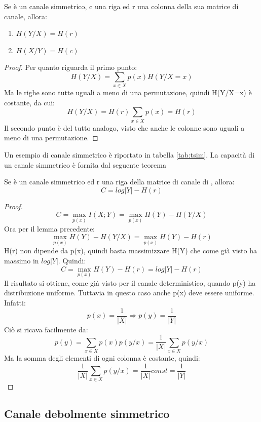 \begin{lemma}
 Se  è un canale simmetrico, c una riga ed r una colonna della sua matrice di canale, allora:
 \begin{enumerate}
  \item $H(Y/X)=H(r)$
  \item $H(X/Y)=H(c)$
 \end{enumerate}
 \begin{proof}
  \mbox{}

  \noindent
  Per quanto riguarda il primo punto:
  \[
   H(Y/X)=\sum_{x \in X}p(x)H(Y/X=x)
  \]
  Ma le righe sono tutte uguali a meno di una permutazione, quindi H(Y/X=x) è costante, da cui:
  \[
   H(Y/X)=H(r)\sum_{x \in X}p(x)=H(r)
  \]
  Il secondo punto è del tutto analogo, visto che anche le colonne sono uguali a meno di una permutazione.
 \end{proof}

\end{lemma}

\noindent
Un esempio di canale simmetrico è riportato in tabella \ref{tab:tsim}.
La capacità di un canale simmetrico è fornita dal seguente teorema

\begin{teorema}
 Se  è un canale simmetrico ed r una riga della matrice di canale di , allora:
 \[
  C=log|Y| - H(r)
 \]
 \begin{proof}
\[
  C=\max_{p(x)} I(X;Y)=\max_{p(x)} H(Y)-H(Y/X)
\]
 Ora per il lemma precedente:
 \[
  \max_{p(x)} H(Y)-H(Y/X)=\max_{p(x)} H(Y)-H(r)
 \]
 H(r) non dipende da p(x), quindi basta massimizzare H(Y) che come già visto ha massimo in $log|Y|$. Quindi:
 \[
  C=\max_{p(x)} H(Y)-H(r)=log |Y| - H(r)
 \]
 Il risultato si ottiene, come già visto per il canale deterministico, quando p(y) ha distribuzione uniforme.
 Tuttavia in questo caso anche p(x) deve essere uniforme. Infatti:
 \[
  p(x)=\frac{1}{|X|} \Rightarrow p(y)=\frac{1}{|Y|}
 \]
 Ciò si ricava facilmente da:
 \[
  p(y)=\sum_{x \in X} p(x)p(y/x)=\frac{1}{|X|} \sum_{x \in X}p(y/x)
 \]
 Ma la somma degli elementi di ogni colonna è costante, quindi:
 \[
  \frac{1}{|X|} \sum_{x \in X}p(y/x)=\frac{1}{|X|} const=\frac{1}{|Y|}
 \]
 \end{proof}

\end{teorema}

\subsection{Canale debolmente simmetrico}

